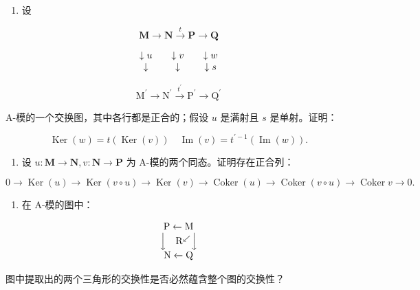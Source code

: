 
\begin{enumerate}
\def\labelenumi{\arabic{enumi})}
\tightlist
\item
  设
\end{enumerate}

\[
\mathbf {M} \rightarrow \mathbf {N} \xrightarrow {t} \mathbf {P} \rightarrow \mathbf {Q}
\]

\[
\begin{array}{c c c c c} \downarrow u & & \downarrow v & & \downarrow w \\ \downarrow & & \downarrow & & \downarrow s \end{array}
\]

\[
\mathrm{M} ^ {\prime} \rightarrow \mathrm{N} ^ {\prime} \xrightarrow {t ^ {\prime}} \mathrm{P} ^ {\prime} \rightarrow \mathrm{Q} ^ {\prime}
\]

A-模的一个交换图，其中各行都是正合的；假设 \(u\) 是满射且 \(s\) 是单射。证明：

\[
\operatorname{Ker} (w) = t (\operatorname{Ker} (v)) \quad \operatorname{Im} (v) = t ^ {\prime - 1} (\operatorname{Im} (w)).
\]

\begin{enumerate}
\def\labelenumi{\arabic{enumi})}
\setcounter{enumi}{1}
\tightlist
\item
  设 \(u: \mathbf{M} \to \mathbf{N}, v: \mathbf{N} \to \mathbf{P}\) 为 A-模的两个同态。证明存在正合列：
\end{enumerate}

\[
0 \rightarrow \operatorname{Ker} (u) \rightarrow \operatorname{Ker} (v \circ u) \rightarrow \operatorname{Ker} (v) \rightarrow \operatorname{Coker} (u) \rightarrow \operatorname{Coker} (v \circ u) \rightarrow \operatorname{Coker} v \rightarrow 0.
\]

\begin{enumerate}
\def\labelenumi{\arabic{enumi})}
\setcounter{enumi}{2}
\tightlist
\item
  在 A-模的图中：
\end{enumerate}

\[
\begin{array}{c} \mathrm{P} \xleftarrow {} \mathrm{M} \\ \Big \downarrow \quad \mathrm{R} ^ {\swarrow} \Big \downarrow \\ \mathrm{N} \xleftarrow {} \mathrm{Q} \end{array}
\]

图中提取出的两个三角形的交换性是否必然蕴含整个图的交换性？

